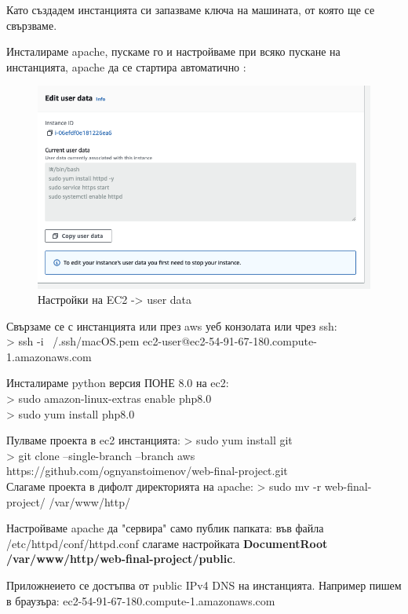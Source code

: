 \documentclass[12pt]{article}
\begin{document}
Като създадем инстанцията си запазваме ключа на машината, от която ще се свързваме.

Инсталираме apache, пускаме го и настройваме при всяко пускане на инстанцията, apache да се стартира автоматично :
\begin{figure}[h!]
    \centering
            \includegraphics[scale=0.5]{81908_fig3.png}
            \caption{Настройки на EC2 -> user data}
    \end{figure}

Свързаме се с инстанцията или през aws уеб конзолата или чрез ssh: \\
> ssh -i ~/.ssh/macOS.pem ec2-user@ec2-54-91-67-180.compute-1.amazonaws.com

Инсталираме python версия ПОНЕ 8.0 на ec2: \\
> sudo  amazon-linux-extras enable php8.0 \\
> sudo yum install php8.0

Пулваме проекта в ec2 инстанцията:
> sudo yum install git \\
> git clone --single-branch --branch aws https://github.com/ognyanstoimenov/web-final-project.git \\

Слагаме проекта в дифолт директорията на apache:
> sudo mv -r web-final-project/ /var/www/http/

Настройваме apache да "сервира" само публик папката:
във файла /etc/httpd/conf/httpd.conf слагаме настройката \textbf{DocumentRoot /var/www/http/web-final-project/public}.

Приложнеието се достъпва от public IPv4 DNS на инстанцията.
Например пишем в браузъра:
ec2-54-91-67-180.compute-1.amazonaws.com

\pagebreak
\end{document}
